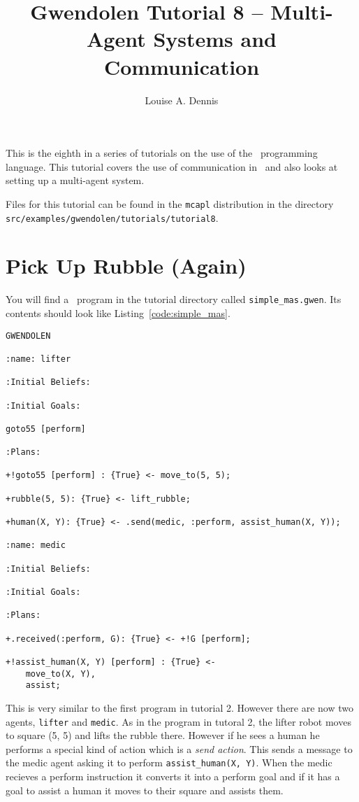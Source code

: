 \documentclass[a4]{article}
\author{Louise A. Dennis}
\title{Gwendolen Tutorial 8 -- Multi-Agent Systems and Communication}
\begin{document}
\maketitle
This is the eighth in a series of tutorials on the use of the \gwendolen\ programming language.  This tutorial covers the use of communication in \gwendolen\ and also looks at setting up a multi-agent system.

Files for this tutorial can be found in the \texttt{mcapl} distribution in the directory \texttt{src/examples/gwendolen/tutorials/tutorial8}.

\section{Pick Up Rubble (Again)}

You will find a \gwendolen\ program in the tutorial directory called \texttt{simple_mas.gwen}.  Its contents should look like Listing~\ref{code:simple_mas}.
\begin{lstlisting}[float,caption=Simple Multi-Agent System,basicstyle=\sffamily,style=easslisting,language=Gwendolen,label=code:simple_mas]
GWENDOLEN

:name: lifter

:Initial Beliefs:

:Initial Goals:

goto55 [perform]

:Plans:

+!goto55 [perform] : {True} <- move_to(5, 5);

+rubble(5, 5): {True} <- lift_rubble;

+human(X, Y): {True} <- .send(medic, :perform, assist_human(X, Y));

:name: medic

:Initial Beliefs:

:Initial Goals:

:Plans:

+.received(:perform, G): {True} <- +!G [perform];

+!assist_human(X, Y) [perform] : {True} <- 
	move_to(X, Y),
	assist;
\end{lstlisting}

This is very similar to the first program in tutorial 2.  However  there are now two agents, \texttt{lifter} and \texttt{medic}.  As in the program in tutoral 2, the lifter robot moves to square (5, 5) and lifts the rubble there.  However if he sees a human he performs a special kind of action which is a \emph{send action}.  This sends a message to the medic agent asking it to perform \texttt{assist\_human(X, Y)}.  When the medic recieves a perform instruction it converts it into a perform goal and if it has a goal to assist a human it moves to their square and assists them.
\end{document}
